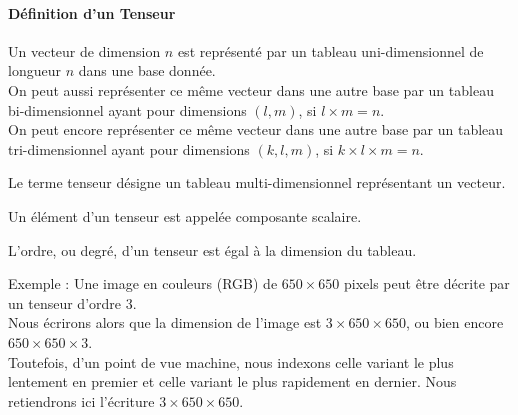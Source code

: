 \documentclass[10pt,a4paper]{report}
\begin{document}
				\paragraph{Définition d'un Tenseur}
				Un vecteur de dimension $n$ est représenté par un tableau uni-dimensionnel de longueur $n$ dans une base donnée.\\
				On peut aussi représenter ce même vecteur dans une autre base par un tableau bi-dimensionnel ayant pour dimensions $(l,m)$, si $l \times m = n$.\\
				On peut encore représenter ce même vecteur dans une autre base par un tableau tri-dimensionnel ayant pour dimensions $(k,l,m)$, si $k \times l \times m = n$.\\
				\begin{center}
					Le terme tenseur désigne un tableau multi-dimensionnel représentant un vecteur.
				\end{center}
				Un élément d'un tenseur est appelée composante scalaire.\\
				\begin{center}
					L'ordre, ou degré, d'un tenseur est égal à la dimension du tableau.
				\end{center}
				Exemple : Une image en couleurs (RGB) de $650 \times 650$ pixels peut être décrite par un tenseur d'ordre $3$.\\
				Nous écrirons alors que la dimension de l'image est $3 \times 650 \times 650$, ou bien encore $650 \times 650 \times 3$.\\
				Toutefois, d'un point de vue machine, nous indexons celle variant le plus lentement en premier et celle variant le plus rapidement en dernier. Nous retiendrons ici l'écriture $3 \times 650 \times 650$.
				
				
			
			
			
\end{document}
